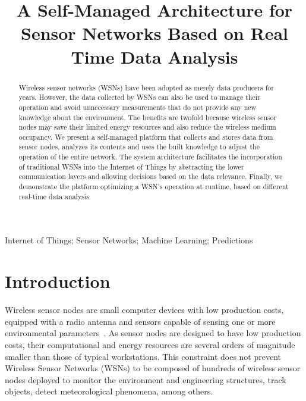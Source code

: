 \documentclass[conference, letterpaper]{IEEEtran}
\begin{document}
\title{A Self-Managed Architecture for Sensor Networks Based on Real Time Data 
Analysis}

\author{
}

\maketitle


\begin{abstract}
Wireless sensor networks (WSNs) have been adopted as merely data producers for years. However, the data collected by WSNs can also be used to manage their operation and avoid unnecessary measurements that do not provide any new knowledge about the environment. The benefits are twofold because wireless sensor nodes may save their limited energy resources and also reduce the wireless medium occupancy. We present a self-managed platform that collects and stores data from sensor nodes, analyzes its contents and uses the built knowledge to adjust the operation of the entire network. The system architecture facilitates the incorporation of traditional WSNs into the Internet of Things by abstracting the lower communication layers and allowing decisions based on the data relevance. Finally, 
we demonstrate the platform optimizing a WSN's operation at runtime, based on different real-time data analysis.

\end{abstract}

\begin{IEEEkeywords}
Internet of Things; Sensor Networks; Machine Learning; Predictions
\end{IEEEkeywords}

\section{Introduction}

Wireless sensor nodes are small computer devices with low production costs, equipped with a radio antenna and sensors capable of sensing one or more environmental parameters~\cite{Akyildiz2002}. As sensor nodes are designed to have low production costs, their computational and energy resources are several orders of magnitude smaller than those of typical workstations. This constraint does not prevent Wireless Sensor Networks (WSNs) to be composed of hundreds of wireless sensor nodes deployed to monitor the environment and engineering structures, track objects, detect meteorological phenomena, among others.
\end{document}
